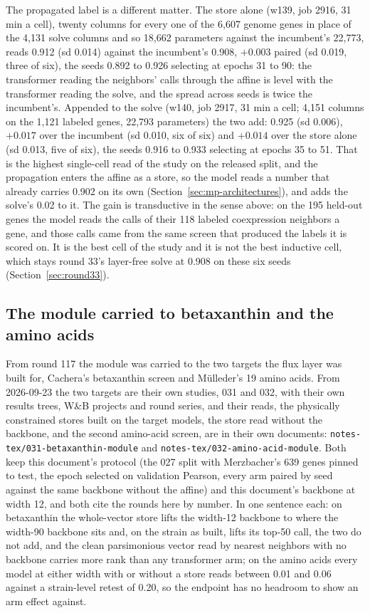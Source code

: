 The propagated label is a different matter. The store alone (w139, job 2916, 31 min
a cell), twenty columns for every one of the 6,607 genome genes in place of the 4,131
solve columns and so 18,662 parameters against the incumbent's 22,773, reads 0.912
(sd 0.014) against the incumbent's 0.908, $+0.003$ paired (sd 0.019, three of six),
the seeds 0.892 to 0.926 selecting at epochs 31 to 90: the transformer reading the
neighbors' calls through the affine is level with the transformer reading the solve,
and the spread across seeds is twice the incumbent's. Appended to the solve (w140,
job 2917, 31 min a cell; 4,151 columns on the 1,121 labeled genes, 22,793 parameters)
the two add: 0.925 (sd 0.006), $+0.017$ over the incumbent (sd 0.010, six of six) and
$+0.014$ over the store alone (sd 0.013, five of six), the seeds 0.916 to 0.933
selecting at epochs 35 to 51. That is the highest single-cell read of the study on the
released split, and the propagation enters the affine as a store, so the model reads a
number that already carries 0.902 on its own
(Section~\ref{sec:mp-architectures}), and adds the solve's 0.02 to it. The gain is
transductive in the sense above: on the 195 held-out genes the model reads the calls
of their 118 labeled coexpression neighbors a gene, and those calls came from the same
screen that produced the labels it is scored on. It is the best cell of the study and
it is not the best inductive cell, which stays round 33's layer-free solve at 0.908 on
these six seeds (Section~\ref{sec:round33}).



\subsection{The module carried to betaxanthin and the amino acids}
\label{sec:target-transfer}

From round 117 the module was carried to the two targets the flux layer was built for,
Cachera's betaxanthin screen and M\"ulleder's 19 amino acids. From 2026-09-23 the two
targets are their own studies, 031 and 032, with their own results trees, W\&B projects
and round series, and their reads, the physically constrained stores built on the target
models, the store read without the backbone, and the second amino-acid screen, are in
their own documents: \texttt{notes-tex/031-betaxanthin-module} and
\texttt{notes-tex/032-amino-acid-module}. Both keep this document's protocol (the 027
split with Merzbacher's 639 genes pinned to test, the epoch selected on validation
Pearson, every arm paired by seed against the same backbone without the affine) and
this document's backbone at width 12, and both cite the rounds here by number. In one
sentence each: on betaxanthin the whole-vector store lifts the width-12 backbone to
where the width-90 backbone sits and, on the strain as built, lifts its top-50 call, the
two do not add, and the clean parsimonious vector read by nearest neighbors with no
backbone carries more rank than any transformer arm; on the amino acids every model at
either width with or without a store reads between 0.01 and 0.06 against a strain-level
retest of 0.20, so the endpoint has no headroom to show an arm effect against.

